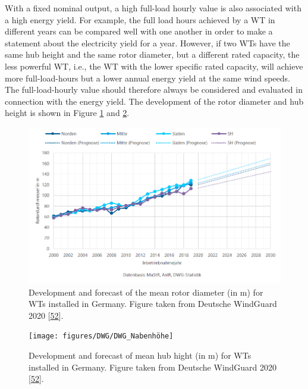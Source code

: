 \documentclass[a4paper,11pt]{article}
\begin{document}
With a fixed nominal output, a high full-load hourly value is also associated with a high energy yield. For example, the full load hours achieved by a WT in different years can be compared well with one another in order to make a statement about the electricity yield for a year. However, if two WTs have the same hub height and the same rotor diameter, but a different rated capacity, the less powerful WT, i.e., the WT with the lower specific rated capacity, will achieve more full-load-hours but a lower annual energy yield at the same wind speeds. The full-load-hourly value should therefore always be considered and evaluated in connection with the energy yield. The development of the rotor diameter and hub height is shown in Figure \ref{fig:rotor} and \ref{fig:nabe}.
\begin{figure}

{\centering \includegraphics[width=1\linewidth]{figures/DWG/DWG_Rotordurchmesser} 

}

\caption{Development and forecast of the mean rotor diameter (in m) for WTs installed in Germany. Figure taken from Deutsche WindGuard 2020 {[}\protect\hyperlink{ref-RasmusBorrmannDr.KnudRehfeldtDr.DennisKruse.2020}{52}{]}.}\label{fig:rotor}
\end{figure}
\begin{figure}[H]

{\centering \texttt{[image: figures/DWG/DWG\_Nabenhöhe]} 

}

\caption{Development and forecast of mean hub hight (in m) for WTs installed in Germany. Figure taken from Deutsche WindGuard 2020 {[}\protect\hyperlink{ref-RasmusBorrmannDr.KnudRehfeldtDr.DennisKruse.2020}{52}{]}.}\label{fig:nabe}
\end{figure}
\end{document}
